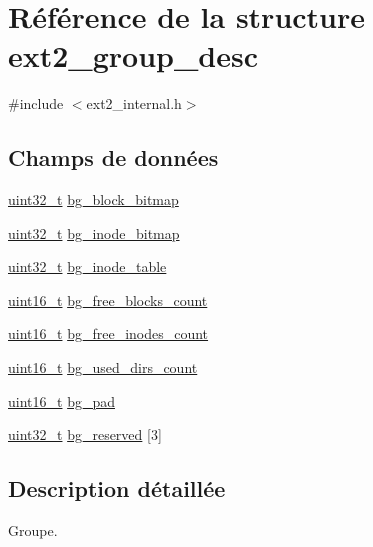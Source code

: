 \hypertarget{structext2__group__desc}{\section{Référence de la structure ext2\-\_\-group\-\_\-desc}
\label{structext2__group__desc}
}


{\ttfamily \#include $<$ext2\-\_\-internal.\-h$>$}

\subsection*{Champs de données}
\begin{DoxyCompactItemize}
\item 
\hyperlink{types_8h_a33594304e786b158f3fb30289278f5af}{uint32\-\_\-t} \hyperlink{structext2__group__desc_a57481ebe34986e28812cc9b4e122c016}{bg\-\_\-block\-\_\-bitmap}
\item 
\hyperlink{types_8h_a33594304e786b158f3fb30289278f5af}{uint32\-\_\-t} \hyperlink{structext2__group__desc_a7ba3737304b14529a45aede6381aa968}{bg\-\_\-inode\-\_\-bitmap}
\item 
\hyperlink{types_8h_a33594304e786b158f3fb30289278f5af}{uint32\-\_\-t} \hyperlink{structext2__group__desc_abf527c572a5fe30354cdf2cfc4f88b26}{bg\-\_\-inode\-\_\-table}
\item 
\hyperlink{types_8h_adf4d876453337156dde61095e1f20223}{uint16\-\_\-t} \hyperlink{structext2__group__desc_af1cf7574780c76da67e973179f6edd43}{bg\-\_\-free\-\_\-blocks\-\_\-count}
\item 
\hyperlink{types_8h_adf4d876453337156dde61095e1f20223}{uint16\-\_\-t} \hyperlink{structext2__group__desc_a5488cd2eb4ea863ca9d15a5df8da6bab}{bg\-\_\-free\-\_\-inodes\-\_\-count}
\item 
\hyperlink{types_8h_adf4d876453337156dde61095e1f20223}{uint16\-\_\-t} \hyperlink{structext2__group__desc_adc9924671cb04dd63b4b7ffff8c262dc}{bg\-\_\-used\-\_\-dirs\-\_\-count}
\item 
\hyperlink{types_8h_adf4d876453337156dde61095e1f20223}{uint16\-\_\-t} \hyperlink{structext2__group__desc_ac99983cee73aa4aace5c7d51b6d5a7e1}{bg\-\_\-pad}
\item 
\hyperlink{types_8h_a33594304e786b158f3fb30289278f5af}{uint32\-\_\-t} \hyperlink{structext2__group__desc_aff7f7dc0b67aed284218b238991f5c93}{bg\-\_\-reserved} \mbox{[}3\mbox{]}
\end{DoxyCompactItemize}


\subsection{Description détaillée}
Groupe. 

